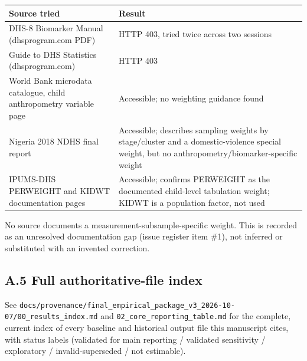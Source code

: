 \begingroup\fontsize{10}{15}\selectfont
\begin{longtable}{ll}
\toprule
Source tried & Result \\
\midrule
\endhead
DHS-8 Biomarker Manual (dhsprogram.com PDF) & HTTP 403, tried twice across two sessions \\
Guide to DHS Statistics (dhsprogram.com) & HTTP 403 \\
World Bank microdata catalogue, child anthropometry variable page & Accessible; no weighting guidance found \\
Nigeria 2018 NDHS final report & Accessible; describes sampling weights by stage/cluster and a domestic-violence special weight, but no anthropometry/biomarker-specific weight \\
IPUMS-DHS PERWEIGHT and KIDWT documentation pages & Accessible; confirms PERWEIGHT as the documented child-level tabulation weight; KIDWT is a population factor, not used \\
\bottomrule
\end{longtable}
\endgroup

No source documents a measurement-subsample-specific weight. This is recorded as an unresolved documentation gap (issue register item \#1), not inferred or substituted with an invented correction.

\subsection*{A.5 Full authoritative-file index}

See \texttt{docs/provenance/final\_empirical\_package\_v3\_2026-10-07/00\_results\_index.md} and \texttt{02\_core\_reporting\_table.md} for the complete, current index of every baseline and historical output file this manuscript cites, with status labels (validated for main reporting / validated sensitivity / exploratory / invalid-superseded / not estimable).
